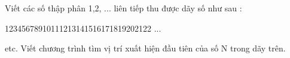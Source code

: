 Viết các số thập phân 1,2, ... liên tiếp thu được dãy số như sau :  

   12345678910111213141516171819202122 ...  

   etc.  Viết chương trình tìm vị trí xuất hiện đầu tiên của số N trong dãy trên.